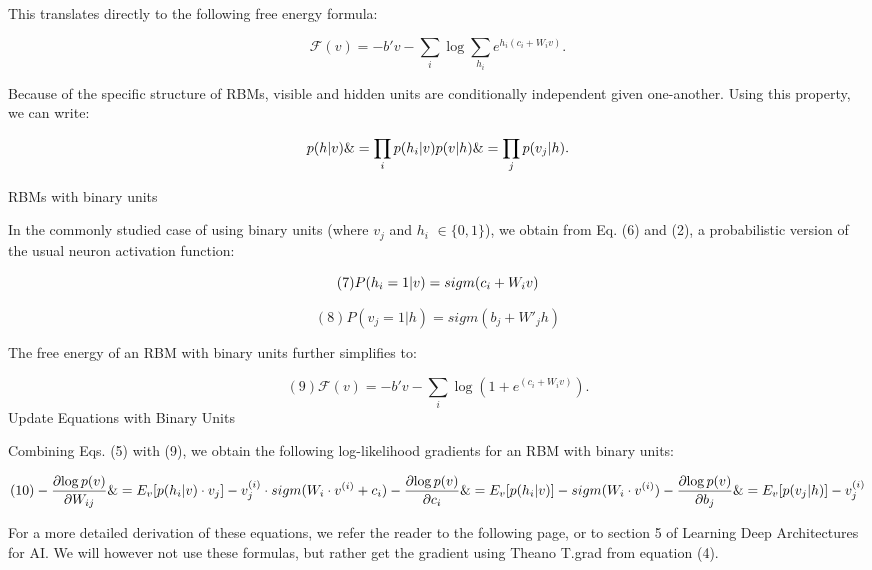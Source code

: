 \documentclass[12pt]{article}
\begin{document}
This translates directly to the following free energy formula:

\begin{equation}
\mathcal{F}(v)= - b'v - \sum_i \log \sum_{h_i} e^{h_i (c_i + W_i v)}.
\end{equation}

Because of the specific structure of RBMs, visible and hidden units are conditionally independent given one-another. Using this property, we can write:

\begin{equation}
p(h|v) \&= \prod_i p(h_i|v) \\
p(v|h) \&= \prod_j p(v_j|h).
\end{equation}

RBMs with binary units

In the commonly studied case of using binary units (where $v_j$ and $h_i$ $\in
\{0,1\}$), we obtain from Eq. (6) and (2), a probabilistic version of the usual neuron activation function:

\begin{equation}
(7)P(h_i=1|v) = sigm(c_i + W_i v) \\
\end{equation}

\begin{equation}
(8)P(v_j=1|h) = sigm(b_j + W'_j h)
\end{equation}

The free energy of an RBM with binary units further simplifies to:

\begin{equation}
(9)\mathcal{F}(v)= - b'v - \sum_i \log(1 + e^{(c_i + W_i v)}).
\end{equation}
Update Equations with Binary Units

Combining Eqs. (5) with (9), we obtain the following log-likelihood gradients for an RBM with binary units:

\begin{equation}
(10)- \frac{\partial{ \log p(v)}}{\partial W_{ij}} \&=
    E_v[p(h_i|v) \cdot v_j]
    - v^{(i)}_j \cdot sigm(W_i \cdot v^{(i)} + c_i) \\
-\frac{\partial{ \log p(v)}}{\partial c_i} \&=
    E_v[p(h_i|v)] - sigm(W_i \cdot v^{(i)})  \\
-\frac{\partial{ \log p(v)}}{\partial b_j} \&=
    E_v[p(v_j|h)] - v^{(i)}_j
\end{equation}

For a more detailed derivation of these equations, we refer the reader to the following page, or to section 5 of Learning Deep Architectures for AI. We will however not use these formulas, but rather get the gradient using Theano T.grad from equation (4).
\end{document}
